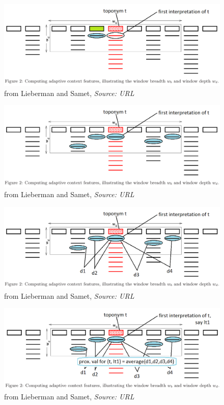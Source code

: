 \documentclass{beamer}
\begin{document}
{\begin{overprint}
		\begin{figure}
			\includegraphics[width=\textwidth]{adaptive-proximity-j1.png} 
			\caption{from Lieberman and Samet, \textit{Source: URL}}
		\end{figure}
		
		\begin{figure}
			\includegraphics[width=\textwidth]{adaptive-proximity-k.png} 
			\caption{from Lieberman and Samet, \textit{Source: URL}}
		\end{figure}
		
		\begin{figure}
			\includegraphics[width=\textwidth]{adaptive-proximity-k1.png} 
			\caption{from Lieberman and Samet, \textit{Source: URL}}
		\end{figure}
		
		\begin{figure}
			\includegraphics[width=\textwidth]{adaptive-proximity-k2.png} 
			\caption{from Lieberman and Samet, \textit{Source: URL}}
		\end{figure}
		

\end{overprint}}
\end{document}
